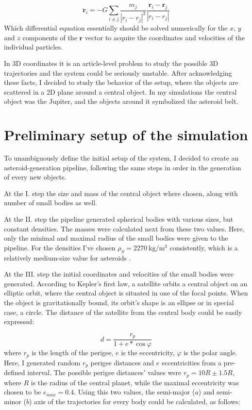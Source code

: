 \begin{multicols}{2}
\begin{equation} \label{eq:2}
\boldsymbol{\ddot{r}}_{i}
=
- G \sum_{i \neq j} \frac{m_{j}}{\left| r_{i} - r_{j} \right|^{2}} \frac{\boldsymbol{r}_{i} - \boldsymbol{r}_{j}}{\left| r_{i} - r_{j} \right|}
\end{equation}
Which differential equation essentially should be solved numerically for the $x$, $y$ and $z$ components of the $\boldsymbol{r}$ vector to acquire the coordinates and velocities of the individual particles. \par
In 3D coordinates it is an article-level problem to study the possible 3D trajectories \citep{3Dtrajectory} and the system could be seriously unstable. After acknowledging these facts, I decided to study the behavior of the setup, where the objects are scattered in a 2D plane around a central object. In my simulations the central object was the Jupiter, and the objects around it symbolized the asteroid belt.

\section{Preliminary setup of the simulation}
To unambiguously define the initial setup of the system, I decided to create an asteroid-generation pipeline, following the same steps in order in the generation of every new objects. \par
At the I. step the size and mass of the central object where chosen, along with number of small bodies as well. \par
At the II. step the pipeline generated spherical bodies with various sizes, but constant densities. The masses were calculated next from these two values. Here, only the minimal and maximal radius of the small bodies were given to the pipeline. For the densities I've chosen $\rho_{S} = 2270\ \text{kg}/\text{m}^{3}$ consistently, which is a relatively medium-size value for asteroids \citep{krasinsky2002hidden}. \par
At the III. step the initial coordinates and velocities of the small bodies were generated. According to Kepler's first law, a satellite orbits a central object on an elliptic orbit, where the central object is situated in one of the focal points. When the object is gravitationally bound, its orbit's shape is an ellipse or in special case, a circle. The distance of the satellite from the central body could be easily expressed:

\begin{equation} \label{eq:3}
d
=
\frac{r_{p}}{1 + e * \cos{\varphi}}
\end{equation}
where $r_{p}$ is the length of the perigee, $e$ is the eccentricity, $\varphi$ is the polar angle. Here, I generated random $r_{p}$ perigee distances and $e$ eccentricities from a pre-defined interval. The possible perigee distances' values were $r_{p} = 10 R \pm 1.5 R$, where $R$ is the radius of the central planet, while the maximal eccentricity was chosen to be $e_{max} = 0.4$. Using this two values, the semi-major ($a$) and semi-minor ($b$) axis of the trajectories for every body could be calculated, as follows:


\end{multicols}
